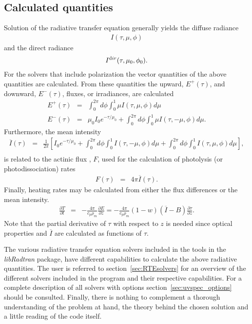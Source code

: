 \subsection{Calculated quantities}
Solution of the radiative transfer equation generally yields the
diffuse radiance
\begin{eqnarray}
  I(\tau, \mu, \phi)
  \label{eq:Radiance}
\end{eqnarray}
and the direct radiance
\begin{eqnarray}
  I^{\text dir}(\tau, \mu_0, \phi_0).
  \label{eq:DirectRadiance}
\end{eqnarray}
For the solvers that include polarization the vector quantities of the
above quantities are calculated.
From these quantities the upward, $E^{+}(\tau)$, and downward,
$E^-(\tau)$, fluxes, or irradiances, are calculated
\begin{eqnarray}
E^+(\tau) &=& \int_0^{2\pi} d\phi \int_{0}^{1} \mu I(\tau,\mu, \phi) d\mu 
  \label{eq:UpwardFlux} \\
E^-(\tau) &=& \mu_0 I_0 e^{-\tau/\mu_0} + \int_0^{2\pi} d\phi \int_{0}^{1} \mu I(\tau,-\mu, \phi) d\mu.
  \label{eq:DownwardFlux}
\end{eqnarray}
Furthermore, the mean intensity 
\begin{eqnarray}
  \overline{I}(\tau) &=& \frac{1}{2\pi} \left[ I_0 e^{-\tau/\mu_0} +
 \int_0^{2\pi}d\phi \int_{0}^{1} I(\tau,-\mu, \phi) d\mu + 
 \int_0^{2\pi}d\phi \int_{0}^{1}  I(\tau,\mu, \phi) d\mu \right],\nonumber\\
  \label{eq:MeanIntensity} 
\end{eqnarray}
is related to the actinic flux
\citep{Madronich1987b}, $F$, used for the calculation of photolysis
(or photodissociation) rates
\begin{eqnarray}
  F(\tau) &=& 4 \pi \overline{I}(\tau).
  \label{eq:ActinicFlux} 
\end{eqnarray}
Finally, heating rates may be calculated from either the flux
differences or the mean intensity.
\begin{eqnarray}
  \frac{\partial T}{\partial t} &=& -\frac{4\pi}{c_p \rho_m}
  \frac{\partial E}{\partial z} =  -\frac{4\pi}{c_p \rho_m}
  (1-w)(\overline{I}-B)\frac{\partial \tau}{\partial z}.
  \label{eq:HeatingRate} 
\end{eqnarray}
Note that the partial derivative of $\tau$ with respect to $z$ is needed
since optical properties and $\overline{I}$ are calculated as functions
of $\tau$.

The various radiative transfer equation solvers included in the
 tools in the {\sl libRadtran} package, have different
capabilities to calculate the above 
radiative quantities. The user is referred to
section~\ref{sec:RTEsolvers} for an overview of the different
solvers included in the  program and their respective
capabilities. For a complete description of all solvers with options
section~\ref{sec:uvspec_options} should be consulted. Finally, there
is nothing to complement a thorough understanding of the problem at
hand, the theory behind the chosen solution and a little reading of
the code itself. 

